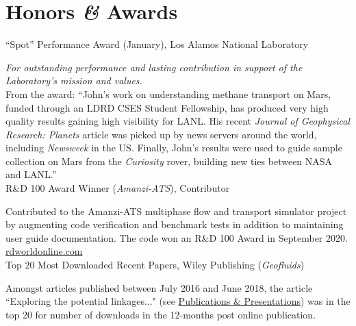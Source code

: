 \documentclass[11pt, letterpaper]{article}
\newcommand{\amper}{{\fontspec[Scale=.95]{Adobe Caslon Pro}\selectfont\itshape\&}}
\newcommand{\years}[1]{\marginnote{\scriptsize #1}}
\begin{document}
\section*{Honors \amper{} Awards}
\label{sec:awards}  %
\noindent
\years{2024}``Spot'' Performance Award (January), Los Alamos National Laboratory

    \emph{For outstanding performance and lasting contribution in support of the
    Laboratory's mission and values.}\\
    From the award:
    ``John's work on understanding methane transport on Mars, funded through an
    LDRD CSES Student Fellowship, has produced very high quality results
    gaining high visibility for LANL. His recent \textit{Journal of Geophysical
    Research: Planets} article was picked up by news servers around the world,
    including \textit{Newsweek} in the US. Finally, John's results were used to
    guide sample collection on Mars from the \textit{Curiosity} rover, building
    new ties between NASA and LANL.''\\

\years{2020}R\&D 100 Award Winner (\emph{Amanzi-ATS}), Contributor

    Contributed to the Amanzi-ATS multiphase flow and transport simulator
    project by augmenting code verification and benchmark tests in addition to
    maintaining user guide documentation. The code won an R\&D 100 Award in
    September 2020.
    \href{https://www.rdworldonline.com/rd-100-award-winners-announced-in-mechanical-materials-category/}{rdworldonline.com}\\

\years{2018}Top 20 Most Downloaded Recent Papers, Wiley Publishing (\emph{Geofluids})

	Amongst articles published between July 2016 and June 2018, the article
	``Exploring the potential linkages..." (see
	\hyperref[sec:pubs]{Publications \& Presentations}) was in the top 20 for
	number of downloads in the 12-months post online publication.\\
\end{document}

